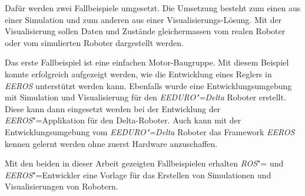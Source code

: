 Dafür werden zwei Fallbeispiele umgesetzt.
Die Umsetzung besteht zum einen aus einer Simulation und zum anderen aus einer Visualisierungs-Lösung.
Mit der Visualisierung sollen Daten und Zustände gleichermassen vom realen Roboter oder vom simulierten Roboter dargestellt werden.


Das erste Fallbeispiel ist eine einfachen Motor-Baugruppe.
Mit diesem Beispiel konnte erfolgreich aufgezeigt werden, wie die Entwicklung eines Reglers in \textit{EEROS} unterstützt werden kann.
Ebenfalls wurde eine Entwicklungsumgebung mit Simulation und Visualisierung für den \textit{EEDURO"=Delta} Roboter erstellt.
Diese kann dann eingesetzt werden bei der Entwicklung der  \textit{EEROS}"=Applikation für den Delta-Roboter.
Auch kann mit der Entwicklungsumgebung vom \textit{EEDURO"=Delta} Roboter das Framework \textit{EEROS} kennen gelernt werden ohne zuerst Hardware anzuschaffen.


Mit den beiden in dieser Arbeit gezeigten Fallbeispielen erhalten \textit{ROS}"= und \textit{EEROS}"=Entwickler eine Vorlage für das Erstellen von Simulationen und Visualisierungen von Robotern.


